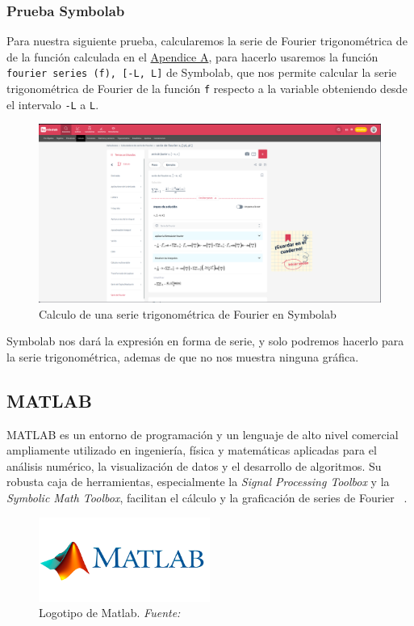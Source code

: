 \subsubsection{Prueba Symbolab}
Para nuestra siguiente prueba, calcularemos la serie de Fourier trigonométrica de de la función calculada en el \hyperref[app1:trig-coeff]{Apendice A}, para hacerlo usaremos la función \texttt{fourier series (f), [-L, L]} de Symbolab, que nos permite calcular la serie trigonométrica de Fourier de la función \texttt{f} respecto a la variable obteniendo desde el intervalo \texttt{-L} a \texttt{L}.
\begin{figure}[H]
	\centering
	\includegraphics[width=1\textwidth]{img/chapter02/symbolab-trig-series.png}
	\caption{Calculo de una serie trigonométrica de Fourier en Symbolab}
	\label{fig:symbolab-trig-series}  %
\end{figure}
Symbolab nos dará la expresión en forma de serie, y solo podremos hacerlo para la serie trigonométrica, ademas de que no nos muestra ninguna gráfica.

\subsection{MATLAB} 
MATLAB es un entorno de programación y un lenguaje de alto nivel comercial ampliamente utilizado en ingeniería, física y matemáticas aplicadas para el análisis numérico, la visualización de datos y el desarrollo de algoritmos. Su robusta caja de herramientas, especialmente la \textit{Signal Processing Toolbox} y la \textit{Symbolic Math Toolbox}, facilitan el cálculo y la graficación de series de Fourier  ~\cite{MathWorks2024}.

\begin{figure}[H]
	\centering
	\includegraphics[width=0.5\textwidth]{img/chapter02/logo_matlab.png}
	\caption[Logotipo de Matlab.]{Logotipo de Matlab. \textit{Fuente: ~\cite{MathWorks2024}}}
	\label{fig:logo-matlab}  %
\end{figure}

